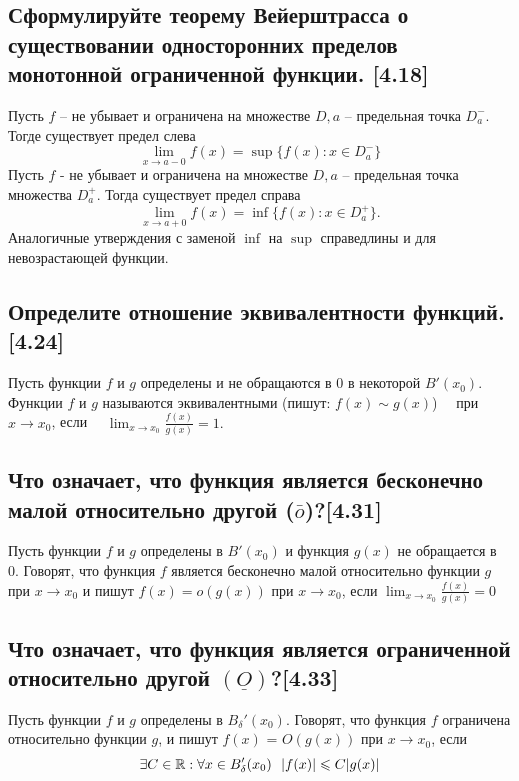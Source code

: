 \documentclass[12pt, a4paper]{article}
\begin{document}
    \subsection{Сформулируйте теорему Вейерштрасса о существовании односторонних пределов монотонной ограниченной функции. [4.18]}
    Пусть $f$ -- не убывает и ограничена на множестве $D, a$ -- предельная точка $D^{-}_a$. Тогде существует предел слева
    \begin{equation*}
        \lim_{x \to a - 0} f(x) = \sup \{f(x) \colon x \in D^{-}_a\}
    \end{equation*}
    Пусть $f$ - не убывает и ограничена на множестве $D, a$ -- предельная точка множества $D^{+}_a$. Тогда существует предел справа
    \begin{equation*}
        \lim_{x \to a + 0} f(x) = \inf \{f(x) \colon x \in D^{+}_a\}.
    \end{equation*}
    Аналогичные утверждения с заменой $\inf$ на $\sup$ справедлины и для невозрастающей функции.
    \subsection{Определите отношение эквивалентности функций.[4.24]}
    Пусть функции $f$ и $g$ определены и не обращаются в 0 в некоторой $B'(x_0).$ Функции $f$ и $g$ называются эквивалентными (пишут: $f(x) \sim g(x)$) \ \ при $x \to x_0$, если \ \ $\lim_{x \to x_0} \frac{f(x)}{g(x)} = 1.$
    \subsection{Что означает, что функция является бесконечно малой относительно другой ($\bar{o}$)?[4.31]}
    Пусть функции $f$ и $g$ определены в $B'(x_0)$ и функция $g(x)$ не обращается в 0. Говорят, что функция $f$ является бесконечно малой относительно функции $g$ при $x \to x_0$ и пишут $f(x) = o(g(x))$ при $x \to x_0$, если $\lim_{x \to x_0} \frac{f(x)}{g(x)}=0$
    \subsection{Что означает, что функция является ограниченной относительно другой $(\underline{O})$?[4.33]}
    Пусть функции $f$ и $g$ определены в $B_{\delta}' (x_0)$. Говорят, что функция $f$ ограничена относительно функции $g$, и пишут $f(x)$ = $O(g(x))$ при $x \to x_0$, если 
    \begin{equation*}
        \exists C \in \mathbb{R} : \forall x \in B_{\delta}' (x_0) \ \ |f(x)| \leqslant C|g(x)|
    \end{equation*}
\end{document}
